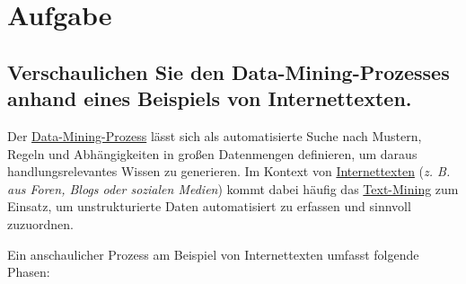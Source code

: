 
\chapter{Aufgabe}
\label{chap:3 Aufgabe}
\thispagestyle{fancy}
\section*{Verschaulichen Sie den Data-Mining-Prozesses anhand eines Beispiels von Internettexten.} \par Der \uline{Data-Mining-Prozess} lässt sich als automatisierte Suche nach Mustern, Regeln und Abhängigkeiten in großen Datenmengen definieren, um daraus handlungsrelevantes Wissen zu generieren. \cite{73}\cite{74} Im Kontext von \uline{Internettexten} (\textit{\acs{z. B.} aus Foren, Blogs oder sozialen Medien}) kommt dabei häufig das \uline{Text-Mining} zum Einsatz, um unstrukturierte Daten automatisiert zu erfassen und sinnvoll zuzuordnen. \cite{75} \par Ein anschaulicher Prozess am Beispiel von Internettexten umfasst folgende Phasen:
